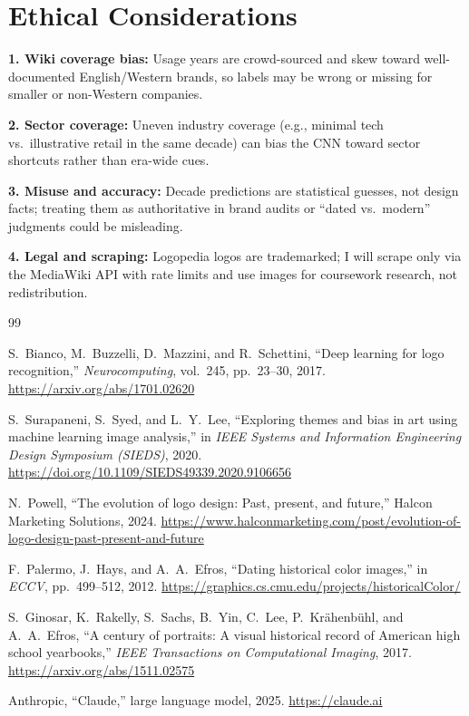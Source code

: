\documentclass[final]{article}
\begin{document}
\section*{Ethical Considerations}

\textbf{1. Wiki coverage bias:}
Usage years are crowd-sourced and skew toward well-documented English/Western brands, so labels may be wrong or missing for smaller or non-Western companies.

\textbf{2. Sector coverage:}
Uneven industry coverage (e.g., minimal tech vs.\ illustrative retail in the same decade) can bias the CNN toward sector shortcuts rather than era-wide cues.

\textbf{3. Misuse and accuracy:}
Decade predictions are statistical guesses, not design facts; treating them as authoritative in brand audits or ``dated vs.\ modern'' judgments could be misleading.

\textbf{4. Legal and scraping:}
Logopedia logos are trademarked; I will scrape only via the MediaWiki API with rate limits and use images for coursework research, not redistribution.

\newpage

\begin{thebibliography}{99}

S.~Bianco, M.~Buzzelli, D.~Mazzini, and R.~Schettini,
``Deep learning for logo recognition,''
\emph{Neurocomputing}, vol.~245, pp.~23--30, 2017.
\url{https://arxiv.org/abs/1701.02620}

S.~Surapaneni, S.~Syed, and L.~Y.~Lee,
``Exploring themes and bias in art using machine learning image analysis,''
in \emph{IEEE Systems and Information Engineering Design Symposium (SIEDS)}, 2020.
\url{https://doi.org/10.1109/SIEDS49339.2020.9106656}

N.~Powell,
``The evolution of logo design: Past, present, and future,''
Halcon Marketing Solutions, 2024.
\url{https://www.halconmarketing.com/post/evolution-of-logo-design-past-present-and-future}

F.~Palermo, J.~Hays, and A.~A.~Efros,
``Dating historical color images,''
in \emph{ECCV}, pp.~499--512, 2012.
\url{https://graphics.cs.cmu.edu/projects/historicalColor/}

S.~Ginosar, K.~Rakelly, S.~Sachs, B.~Yin, C.~Lee, P.~Kr\"ahenb\"uhl, and A.~A.~Efros,
``A century of portraits: A visual historical record of American high school yearbooks,''
\emph{IEEE Transactions on Computational Imaging}, 2017.
\url{https://arxiv.org/abs/1511.02575}

Anthropic,
``Claude,'' large language model, 2025.
\url{https://claude.ai}

\end{thebibliography}
\end{document}
